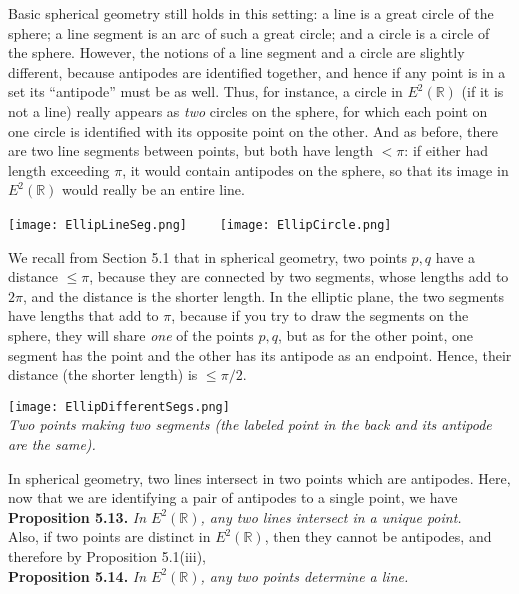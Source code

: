 \documentclass[leqno]{book}
\begin{document}
Basic spherical geometry still holds in this setting: a line is a great circle of the sphere; a line segment is an arc of such a great circle; and a circle is a circle of the sphere.  However, the notions of a line segment and a circle are slightly different, because antipodes are identified together, and hence if any point is in a set its ``antipode'' must be as well.  Thus, for instance, a circle in $E^2(\mathbb R)$ (if it is not a line) really appears as \emph{two} circles on the sphere, for which each point on one circle is identified with its opposite point on the other.  And as before, there are two line segments between points, but both have length $<\pi$: if either had length exceeding $\pi$, it would contain antipodes on the sphere, so that its image in $E^2(\mathbb R)$ would really be an entire line.
\begin{center}
\texttt{[image: EllipLineSeg.png]}~~~~
\texttt{[image: EllipCircle.png]}
\end{center}
We recall from Section 5.1 that in spherical geometry, two points $p,q$ have a distance $\leqslant\pi$, because they are connected by two segments, whose lengths add to $2\pi$, and the distance is the shorter length.  In the elliptic plane, the two segments have lengths that add to $\pi$, because if you try to draw the segments on the sphere, they will share \emph{one} of the points $p,q$, but as for the other point, one segment has the point and the other has its antipode as an endpoint.  Hence, their distance (the shorter length) is $\leqslant\pi/2$.
\begin{center}
\texttt{[image: EllipDifferentSegs.png]}\\
\emph{Two points making two segments (the labeled point in the back and its antipode are the same).}
\end{center}
In spherical geometry, two lines intersect in two points which are antipodes.  Here, now that we are identifying a pair of antipodes to a single point, we have\\

\noindent\textbf{Proposition 5.13.} \emph{In $E^2(\mathbb R)$, any two lines intersect in a unique point.}\\

\noindent Also, if two points are distinct in $E^2(\mathbb R)$, then they cannot be antipodes, and therefore by Proposition 5.1(iii),\\

\noindent\textbf{Proposition 5.14.} \emph{In $E^2(\mathbb R)$, any two points determine a line.}\\
\end{document}
